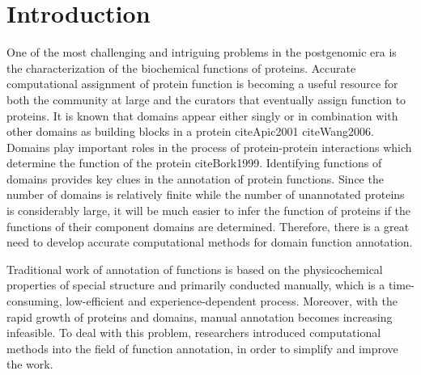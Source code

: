 \documentclass{bmcart}
\begin{document}


\section*{Introduction}
One of the most challenging and intriguing problems in the postgenomic era is the characterization
of the biochemical functions of proteins. Accurate computational assignment of protein function is becoming a useful resource for
both the community at large and the curators that eventually assign function to proteins. It is known that domains appear either singly or in combination with other domains as building blocks in a protein cite{Apic2001} cite{Wang2006}. Domains play important roles in the process of protein-protein interactions which determine the function of the protein cite{Bork1999}. Identifying functions of domains provides key clues in the annotation of protein functions. Since the number of domains is relatively finite while the number of unannotated proteins is considerably large, it will be much easier to infer the function of proteins if the functions of their component domains are determined. Therefore, there is a great need to develop accurate computational methods for domain function annotation.

Traditional work of annotation of functions is based on the physicochemical properties of special structure and primarily conducted manually, which is a time-consuming, low-efficient and experience-dependent process. Moreover, with the rapid growth of proteins and domains, manual annotation becomes increasing infeasible. To deal with this problem, researchers introduced computational methods into the field of function annotation, in order to simplify and improve the work.
\end{document}
